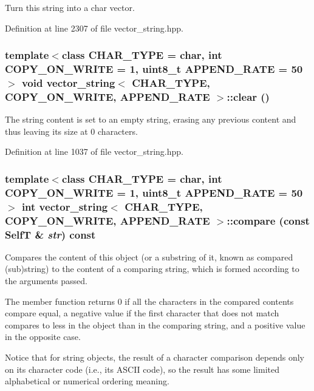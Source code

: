 Turn this string into a char vector. 

Definition at line 2307 of file vector\_\-string.hpp.\hypertarget{classvector__string_f5c9e2462a6d6d5eac6cbf0246ba957f}{
\subsubsection[{clear}]{\setlength{\rightskip}{0pt plus 5cm}template$<$class CHAR\_\-TYPE  = char, int COPY\_\-ON\_\-WRITE = 1, uint8\_\-t APPEND\_\-RATE = 50$>$ void {\bf vector\_\-string}$<$ CHAR\_\-TYPE, COPY\_\-ON\_\-WRITE, APPEND\_\-RATE $>$::clear ()}}
\label{classvector__string_f5c9e2462a6d6d5eac6cbf0246ba957f}


The string content is set to an empty string, erasing any previous content and thus leaving its size at 0 characters. 

Definition at line 1037 of file vector\_\-string.hpp.\hypertarget{classvector__string_1604ed59691edc6579fadedf04fa4cbb}{
\subsubsection[{compare}]{\setlength{\rightskip}{0pt plus 5cm}template$<$class CHAR\_\-TYPE  = char, int COPY\_\-ON\_\-WRITE = 1, uint8\_\-t APPEND\_\-RATE = 50$>$ int {\bf vector\_\-string}$<$ CHAR\_\-TYPE, COPY\_\-ON\_\-WRITE, APPEND\_\-RATE $>$::compare (const {\bf SelfT} \& {\em str}) const}}
\label{classvector__string_1604ed59691edc6579fadedf04fa4cbb}


Compares the content of this object (or a substring of it, known as compared (sub)string) to the content of a comparing string, which is formed according to the arguments passed.

The member function returns 0 if all the characters in the compared contents compare equal, a negative value if the first character that does not match compares to less in the object than in the comparing string, and a positive value in the opposite case.

Notice that for string objects, the result of a character comparison depends only on its character code (i.e., its ASCII code), so the result has some limited alphabetical or numerical ordering meaning.


